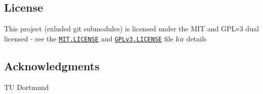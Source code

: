 \subsection*{License}

This project (exluded git submodules) is licensed under the M\+IT and G\+P\+Lv3 dual licensed -\/ see the \href{MIT.LICENSE}{\tt M\+I\+T.\+L\+I\+C\+E\+N\+SE} and \href{GPLv3.LICENSE}{\tt G\+P\+Lv3.\+L\+I\+C\+E\+N\+SE} file for details

\subsection*{Acknowledgments}


\begin{DoxyItemize}
\item TU Dortmund 
\end{DoxyItemize}